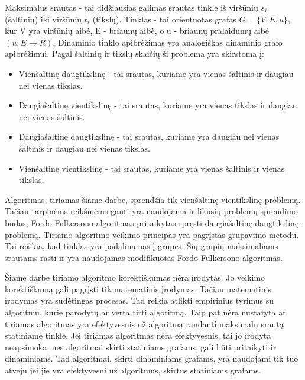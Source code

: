 Maksimalus srautas - tai didžiausias galimas srautas tinkle iš viršūnių $s_i$ (šaltinių) iki viršūnių $t_i$ (tikslų). Tinklas - tai orientuotas grafas $G= \{V, E, u\}$, kur V yra viršūnių aibė, E - briaunų aibė, o u - briaunų pralaidumų aibė $( u : E \rightarrow R )$. Dinaminio tinklo apibrėžimas yra analogiškas dinaminio grafo apibrėžimui. Pagal šaltinių ir tikslų skaičių ši problema yra skirstoma į:
\begin{itemize}
	\item Vienšaltinę daugtikslinę - tai srautas, kuriame yra vienas šaltinis ir daugiau nei vienas tikslas.
	\item Daugiašaltinę vientikslinę - tai srautas, kuriame yra vienas tikslas ir daugiau nei vienas šaltinis.
	\item Daugiašaltinę daugtikslinę - tai srautas, kuriame yra daugiau nei vienas šaltinis ir daugiau nei vienas tikslas.
	\item Vienšaltinę vientikslinę - tai srautas, kuriame yra vienas šaltinis ir vienas tikslas.
\end{itemize}
Algoritmas, tiriamas šiame darbe, sprendžia tik vienšaltinę vientikslinę problemą. Tačiau tarpinėms reikšmėms gauti yra naudojama ir likusių problemų sprendimo būdas, Fordo Fulkersono algoritmas pritaikytas spręsti daugiašaltinę daugtikslinę problemą. Tiriamo algoritmo veikimo principas yra pagrįstas grupavimo metodu. Tai reiškia, kad tinklas yra padalinamas į grupes. Šių grupių maksimaliams srautams rasti ir yra naudojamas modifikuotas Fordo Fulkersono algoritmas.

Šiame darbe tiriamo algoritmo korektiškumas nėra įrodytas. Jo veikimo korektiškumą gali pagrįsti tik matematinis įrodymas. Tačiau matematinis įrodymas yra sudėtingas procesas. Tad reikia atlikti empirinius tyrimus su algoritmu, kurie parodytų ar verta tirti algoritmą. Taip pat nėra nustatyta ar tiriamas algoritmas yra efektyvesnis už algoritmą randantį maksimalų srautą statiniame tinkle. Jei tiriamas algoritmas nėra efektyvesnis, tai jo įrodyta neapsimoka, nes algoritmai skirti statiniams grafams, gali būti pritaikyti ir dinaminiams. Tad algoritmai, skirti dinaminiams grafams, yra naudojami tik tuo atveju jei jie yra efektyvesni už algoritmus, skirtus statiniams grafams.

\newpage

